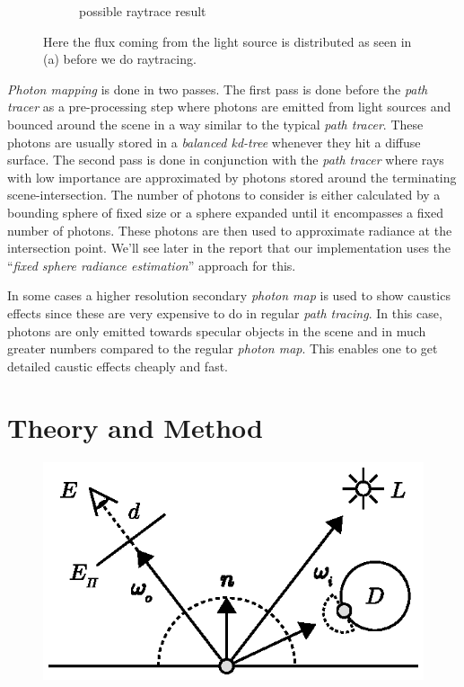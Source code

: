 \documentclass[a4paper, twocolumn]{article}
\begin{document}
\begin{figure}[ht]
\begin{subfigure}{0.498\linewidth}
            \caption{possible raytrace result}
        \end{subfigure}
        \caption{Here the flux coming from the light source is distributed as seen in (a) before we do raytracing.}
        \label{fig:photon_mapping}
    \end{figure}

    \vspace{-0.25em}

    \textit{Photon mapping} is done in two passes. The first pass is done before the \textit{path tracer} as a pre-processing step where photons are emitted from light sources and bounced around the scene in a way similar to the typical \textit{path tracer}. These photons are usually stored in a \emph{balanced kd-tree} whenever they hit a diffuse surface. The second pass is done in conjunction with the \textit{path tracer} where rays with low importance are approximated by photons stored around the terminating scene-intersection. The number of photons to consider is either calculated by a bounding sphere of fixed size or a sphere expanded until it encompasses a fixed number of photons. These photons are then used to approximate radiance at the intersection point. We'll see later in the report that our implementation uses the ``\emph{fixed sphere radiance estimation}'' approach for this.

In some cases a higher resolution secondary \textit{photon map} is used to show caustics effects since these are very expensive to do in regular \textit{path tracing}. In this case, photons are only emitted towards specular objects in the scene and in much greater numbers compared to the regular \textit{photon map}. This enables one to get detailed caustic effects cheaply and fast.

    \section{Theory and Method} \label{sec:theory_and_method}

        \begin{figure}[ht]
            \centering
            \includegraphics[width=0.8\linewidth]{share/raytracing_overview.eps}
            \caption{}
            \label{fig:raytracing_overview}
        \end{figure}
\end{document}
